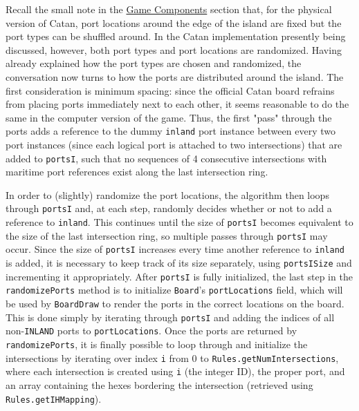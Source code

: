 \documentclass[pageno]{jpaper}
\begin{document}
\begin{doublespacing}
Recall the small note in the \hyperlink{sec:game_components}{Game Components} section that, for the physical version of Catan, port locations around the edge of the island are fixed but the port types can be shuffled around. In the Catan implementation presently being discussed, however, both port types and port locations are randomized. Having already explained how the port types are chosen and randomized, the conversation now turns to how the ports are distributed around the island. The first consideration is minimum spacing: since the official Catan board refrains from placing ports immediately next to each other, it seems reasonable to do the same in the computer version of the game. Thus, the first "pass" through the ports adds a reference to the dummy \lstinline$inland$ port instance between every two port instances (since each logical port is attached to two intersections) that are added to \lstinline$portsI$, such that no sequences of 4 consecutive intersections with maritime port references exist along the last intersection ring. 

In order to (slightly) randomize the port locations, the algorithm then loops through \lstinline$portsI$ and, at each step, randomly decides whether or not to add a reference to \lstinline$inland$. This continues until the size of \lstinline$portsI$ becomes equivalent to the size of the last intersection ring, so multiple passes through \lstinline$portsI$ may occur. Since the size of \lstinline$portsI$ increases every time another reference to \lstinline$inland$ is added, it is necessary to keep track of its size separately, using \lstinline$portsISize$ and incrementing it appropriately. After \lstinline$portsI$ is fully initialized, the last step in the \lstinline$randomizePorts$ method is to initialize \lstinline$Board$'s \lstinline$portLocations$ field, which will be used by \lstinline$BoardDraw$ to render the ports in the correct locations on the board. This is done simply by iterating through \lstinline$portsI$ and adding the indices of all non-\lstinline$INLAND$ ports to \lstinline$portLocations$. Once the ports are returned by \lstinline$randomizePorts$, it is finally possible to loop through and initialize the intersections by iterating over index \lstinline$i$ from 0 to \lstinline$Rules.getNumIntersections$, where each intersection is created using \lstinline$i$ (the integer ID), the proper port, and an array containing the hexes bordering the intersection (retrieved using \lstinline$Rules.getIHMapping$).

\hypertarget{sec:roads}{}

\end{doublespacing}
\end{document}
